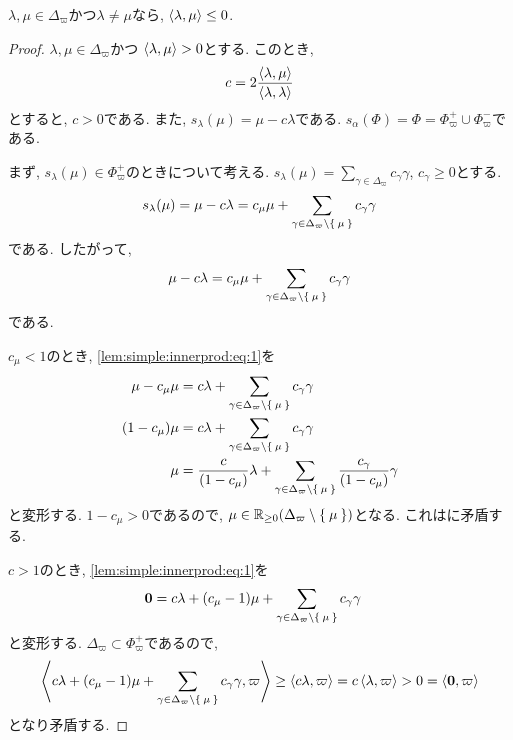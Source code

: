 \begin{lemma}
  \label{lem:pidelta:innerprod}
  $\lambda,\mu\in\Delta_{\varpi}$かつ$\lambda\neq \mu$なら, $\Braket{\lambda,\mu}\leq 0$.
\end{lemma}
\begin{proof}
  $\lambda,\mu\in\Delta_{\varpi}$かつ
  $\Braket{\lambda,\mu}>0$とする.
  このとき,
  \begin{align*}
    c=2\frac{\Braket{\lambda,\mu}}{\Braket{\lambda,\lambda}}
  \end{align*}
  とすると,
  $c>0$である.
  また,
  $s_\lambda(\mu)=\mu-c\lambda$である.
  $s_\alpha(\Phi)=\Phi=\Phi_{\varpi}^+\cup\Phi_{\varpi}^-$である.

  まず, $s_\lambda(\mu)\in\Phi_{\varpi}^+$のときについて考える.
  $s_\lambda(\mu)=\sum_{\gamma\in\Delta_{\varpi}}c_\gamma\gamma$,
  $c_\gamma\geq 0$とする.
  \begin{align*}
    s_\lambda(\mu)=\mu-c\lambda
    =c_\mu\mu+\sum_{\gamma\in\Delta_{\varpi}\setminus\Set{\mu}}c_\gamma\gamma
  \end{align*}
  である.
  したがって,
  \begin{align}
    \label{lem:simple:innerprod:eq:1}
    \mu-c\lambda
    =c_\mu\mu+\sum_{\gamma\in\Delta_{\varpi}\setminus\Set{\mu}}c_\gamma\gamma
  \end{align}
  である.

  $c_\mu<1$のとき,
  \cref{lem:simple:innerprod:eq:1}を
  \begin{align*}
    \mu-c_\mu\mu
    &=c\lambda+\sum_{\gamma\in\Delta_{\varpi}\setminus\Set{\mu}}c_\gamma\gamma\\
    (1-c_\mu)\mu
    &=c\lambda+\sum_{\gamma\in\Delta_{\varpi}\setminus\Set{\mu}}c_\gamma\gamma\\
    \mu
    &=\frac{c}{(1-c_\mu)}\lambda+
    \sum_{\gamma\in\Delta_{\varpi}\setminus\Set{\mu}}\frac{c_\gamma}{(1-c_\mu)}\gamma\\
  \end{align*}
  と変形する.
   $1-c_\mu>0$であるので, $\mu\in \mathbb{R}_{\geq 0}(\Delta_{\varpi}\setminus\Set{\mu})$となる.
  これはに矛盾する.

  $c>1$のとき,
  \cref{lem:simple:innerprod:eq:1}を
  \begin{align*}
    \boldsymbol{0}
    &=c\lambda+(c_\mu -1)\mu+\sum_{\gamma\in\Delta_{\varpi}\setminus\Set{\mu}}c_\gamma\gamma
  \end{align*}
  と変形する.
  $\Delta_{\varpi}\subset\Phi_\varpi^+$であるので,
  \begin{align*}
    \Braket{c\lambda+(c_\mu -1)\mu+\sum_{\gamma\in\Delta_{\varpi}\setminus\Set{\mu}}c_\gamma\gamma,\varpi} \geq
    \Braket{c\lambda,\varpi}=c\Braket{\lambda,\varpi}>0=\Braket{\boldsymbol{0},\varpi}
  \end{align*}
  となり矛盾する.
  


\end{proof}
